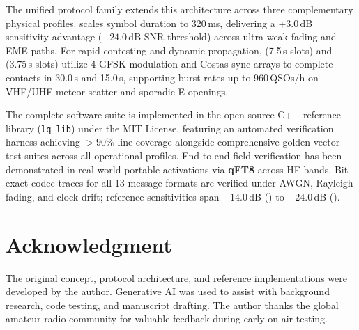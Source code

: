 The unified protocol family extends this architecture across three complementary physical profiles.  scales symbol duration to 320\,ms, delivering a $+3.0$\,dB sensitivity advantage ($-24.0$\,dB SNR threshold) across ultra-weak fading and EME paths. For rapid contesting and dynamic propagation,  (7.5\,s slots) and  (3.75\,s slots) utilize 4-GFSK modulation and Costas sync arrays to complete contacts in 30.0\,s and 15.0\,s, supporting burst rates up to 960\,QSOs/h on VHF/UHF meteor scatter and sporadic-E openings.

The complete software suite is implemented in the open-source C++ reference library (\texttt{lq\_lib}) under the MIT License, featuring an automated verification harness achieving $>90\%$ line coverage alongside comprehensive golden vector test suites across all operational profiles. End-to-end field verification has been demonstrated in real-world portable activations via \textbf{qFT8} across HF bands. Bit-exact codec traces for all 13 message formats are verified under AWGN, Rayleigh fading, and clock drift; reference sensitivities span $-14.0$\,dB () to $-24.0$\,dB ().

\section*{Acknowledgment}
The original concept, protocol architecture, and reference implementations were developed by the author. Generative AI was used to assist with background research, code testing, and manuscript drafting. The author thanks the global amateur radio community for valuable feedback during early on-air testing.

\pagebreak

